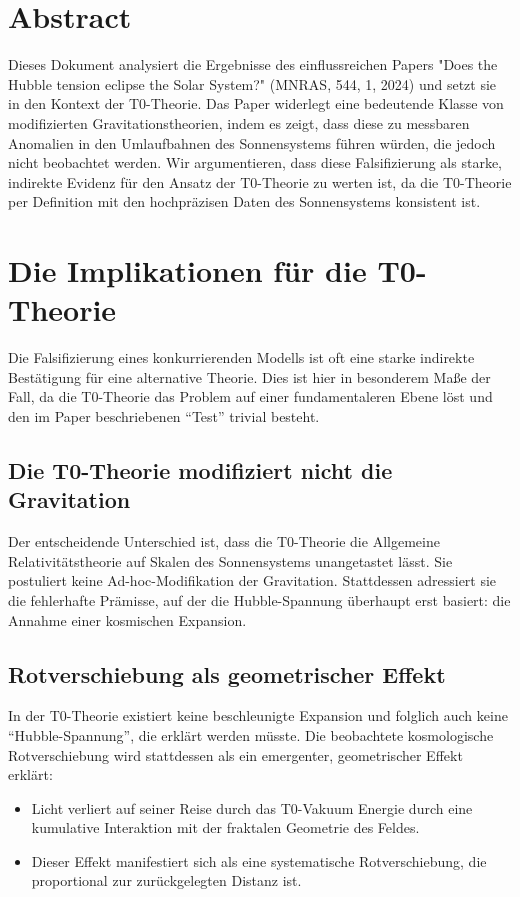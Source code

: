 \section*{Abstract}
    Dieses Dokument analysiert die Ergebnisse des einflussreichen Papers "Does the Hubble tension eclipse the Solar System?" (MNRAS, 544, 1, 2024) \cite{nathan2024} und setzt sie in den Kontext der T0-Theorie. Das Paper widerlegt eine bedeutende Klasse von modifizierten Gravitationstheorien, indem es zeigt, dass diese zu messbaren Anomalien in den Umlaufbahnen des Sonnensystems führen würden, die jedoch nicht beobachtet werden. Wir argumentieren, dass diese Falsifizierung als starke, indirekte Evidenz für den Ansatz der T0-Theorie zu werten ist, da die T0-Theorie per Definition mit den hochpräzisen Daten des Sonnensystems konsistent ist.



\section{Die Implikationen für die T0-Theorie}

Die Falsifizierung eines konkurrierenden Modells ist oft eine starke indirekte Bestätigung für eine alternative Theorie. Dies ist hier in besonderem Maße der Fall, da die T0-Theorie das Problem auf einer fundamentaleren Ebene löst und den im Paper beschriebenen ``Test'' trivial besteht.

\subsection{Die T0-Theorie modifiziert nicht die Gravitation}
Der entscheidende Unterschied ist, dass die T0-Theorie die Allgemeine Relativitätstheorie auf Skalen des Sonnensystems unangetastet lässt. Sie postuliert keine Ad-hoc-Modifikation der Gravitation. Stattdessen adressiert sie die fehlerhafte Prämisse, auf der die Hubble-Spannung überhaupt erst basiert: die Annahme einer kosmischen Expansion.

\subsection{Rotverschiebung als geometrischer Effekt}
In der T0-Theorie existiert keine beschleunigte Expansion und folglich auch keine ``Hubble-Spannung'', die erklärt werden müsste. Die beobachtete kosmologische Rotverschiebung wird stattdessen als ein emergenter, geometrischer Effekt erklärt:
\begin{itemize}
    \item Licht verliert auf seiner Reise durch das T0-Vakuum Energie durch eine kumulative Interaktion mit der fraktalen Geometrie des Feldes.
    \item Dieser Effekt manifestiert sich als eine systematische Rotverschiebung, die proportional zur zurückgelegten Distanz ist.
\end{itemize}

